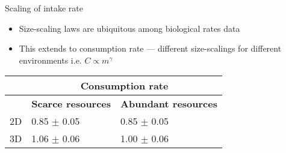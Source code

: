 \documentclass[xcolor={table}]{beamer}
\begin{document}
\begin{frame}[fragile=singleslide,t]
\begin{columns}[onlytextwidth,T]
\begin{column}{.47\textwidth}
\begin{block}{Scaling of intake rate}
    \begin{itemize}
        \item Size-scaling laws are ubiquitous among biological rates data \autocite{peters1983}
        \item This extends to consumption rate --- different size-scalings for different environments i.e. $C \propto m^\gamma$ \autocite{Pawar2012}
    \end{itemize}
         
\end{block}

\begin{table}
    \begin{tabularx}{\linewidth}{l  X  X  }
    \toprule
        & \multicolumn{2}{c}{\textbf{Consumption rate}}                                        \\
    \midrule
        & \multicolumn{1}{c}{\textbf{Scarce resources}} & \multicolumn{1}{c}{\textbf{Abundant resources}} \\
    \midrule
     2D & 0.85 $\pm$ 0.05                      & 0.85 $\pm$ 0.05                        \\
    \midrule
     3D & 1.06 $\pm$ 0.06                      & 1.00 $\pm$ 0.06                        \\              
    \bottomrule
    \end{tabularx}
\end{table}



\end{column}
\end{columns}
\end{frame}
\end{document}
